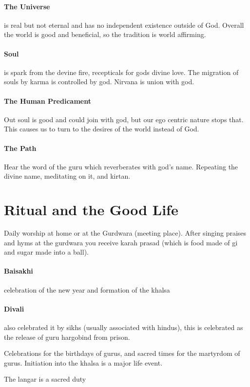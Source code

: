 \documentclass{article}
\begin{document}
\paragraph{The Universe}
\label{par:the_universe}
is real but not eternal and has no independent existence outside of God. Overall the world is good and beneficial, so the tradition is world affirming.

\paragraph{Soul}
\label{par:soul}
is spark from the devine fire, recepticals for gods divine love. The migration of souls by karma is controlled by god. Nirvana is union with god.

\paragraph{The Human Predicament}
\label{par:the_human_predicament}
Out soul is good and could join with god, but our ego centric nature stops that. This causes us to turn to the desires of the world instead of God.

\paragraph{The Path}
\label{par:the_path}
Hear the word of the guru which reverberates with god's name. Repeating the divine name, meditating on it, and kirtan.


\section*{Ritual and the Good Life}
\label{sec:ritual_and_the_good_life}
Daily worship at home or at the Gurdwara (meeting place). After singing praises and hyms at the gurdwara you receive karah prasad (which is food made of gi and sugar made into a ball).

\paragraph{Baisakhi}
\label{par:baisakhi}
celebration of the new year and formation of the khalsa

\paragraph{Divali}
\label{par:divali}
also celebrated it by sikhs (usually associated with hindus), this is celebrated as the release of guru hargobind from prison.

Celebrations for the birthdays of gurus, and sacred times for the martyrdom of gurus. Initiation into the khalsa is a major life event.

The langar is a sacred duty
\end{document}
